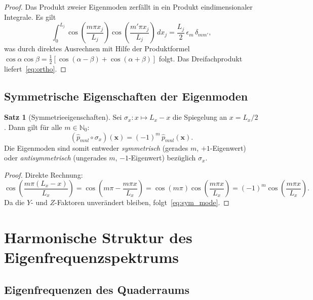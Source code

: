 ﻿\documentclass[12pt, a4paper]{article}
\theoremstyle{definition}
\newtheorem{satz}{Satz}[section]
\theoremstyle{remark}
\newcommand{\N}{\mathbb{N}}
\newcommand{\Lx}{L_x}
\begin{document}
\begin{proof}
Das Produkt zweier Eigenmoden zerfällt in ein Produkt eindimensionaler
Integrale. Es gilt
\[
  \int_0^{L_j} \cos\!\left(\frac{m\pi x_j}{L_j}\right)
  \cos\!\left(\frac{m'\pi x_j}{L_j}\right)\,dx_j
  = \frac{L_j}{2}\,\epsilon_m\,\delta_{mm'},
\]
was durch direktes Ausrechnen mit Hilfe der Produktformel
$\cos\alpha\cos\beta = \frac{1}{2}[\cos(\alpha-\beta)+\cos(\alpha+\beta)]$
folgt. Das Dreifachprodukt liefert~\eqref{eq:ortho}. 
\end{proof}

\subsection{Symmetrische Eigenschaften der Eigenmoden}

\begin{satz}[Symmetrieeigenschaften]
\label{satz:sym}
Sei $\sigma_x: x \mapsto \Lx - x$ die Spiegelung an $x = \Lx/2$.
Dann gilt für alle $m \in \N_0$:
\begin{equation}
  (\hat{p}_{mnl} \circ \sigma_x)(\mathbf{x}) = (-1)^m\,\hat{p}_{mnl}(\mathbf{x}).
  \label{eq:sym_mode}
\end{equation}
Die Eigenmoden sind somit entweder \emph{symmetrisch} (gerades $m$, $+1$-Eigenwert)
oder \emph{antisymmetrisch} (ungerades $m$, $-1$-Eigenwert) bezüglich $\sigma_x$.
\end{satz}

\begin{proof}
Direkte Rechnung:
\[
  \cos\!\left(\frac{m\pi(\Lx - x)}{\Lx}\right)
  = \cos\!\left(m\pi - \frac{m\pi x}{\Lx}\right)
  = \cos(m\pi)\cos\!\left(\frac{m\pi x}{\Lx}\right)
  = (-1)^m \cos\!\left(\frac{m\pi x}{\Lx}\right).
\]
Da die $Y$- und $Z$-Faktoren unverändert bleiben, folgt~\eqref{eq:sym_mode}. 
\end{proof}

\section{Harmonische Struktur des Eigenfrequenzspektrums}
\label{sec:harmonik}

\subsection{Eigenfrequenzen des Quaderraums}
\end{document}
